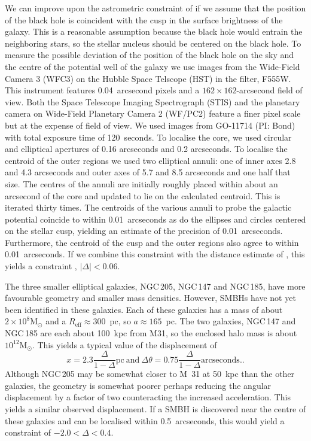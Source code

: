 \documentclass[useAMS,usenatbib]{mn2e}
\newcommand{\msun}{\mathrm{M}_\odot}
\begin{document}
We can improve upon the astrometric constraint of
\citet{2015arXiv150203231Y} if we assume that the position of the
black hole is coincident with the cusp in the surface brightness of
the galaxy.  This is a reasonable assumption because the black hole
would entrain the neighboring stars, so the stellar nucleus should be
centered on the black hole. To measure the possible deviation of the
position of the black hole on the sky and the centre of the potential
well of the galaxy we use images from the Wide-Field Camera 3 (WFC3)
on the Hubble Space Telscope (HST) in the filter, F555W.  This
instrument features 0.04~arcsecond pixels and a $162 \times
162$-arcsecond field of view.  Both the Space Telescope Imaging
Spectrograph (STIS) and the planetary camera on Wide-Field Planetary
Camera 2 (WF/PC2) feature a finer pixel scale but at the expense of
field of view.  We used images from GO-11714 (PI: Bond) with total
exposure time of 120~seconds.  To localise the core, we used circular
and elliptical apertures of 0.16 arcseconds and 0.2 arcseconds.  To
localise the centroid of the outer regions we used two elliptical
annuli: one of inner axes 2.8 and 4.3 arcseconds and outer axes of 5.7
and 8.5 arcseconds and one half that size.  The centres of the annuli
are initially roughly placed within about an arcsecond of the core and
updated to lie on the calculated centroid. This is iterated thirty
times.  The centroids of the various annuli to probe the galactic
potential coincide to within 0.01~arcseconds as do the ellipses and
circles centered on the stellar cusp, yielding an estimate of the
precision of 0.01~arcseconds.  Furthermore, the centroid of the cusp
and the outer regions also agree to within 0.01~arcseconds.  If we
combine this constraint with the distance estimate of
\citet{2006AJ....131.1405K}, this yields a 
constraint
, $|\Delta|<
0.06$.

The three smaller elliptical galaxies, NGC\,205, NGC\,147 and NGC\,185,
have more favourable geometry and smaller mass densities.  However,
SMBHs have not yet been identified in these galaxies.  Each of these
galaxies has a mass of about $2 \times 10^8 \msun$ and a
$R_\mathrm{eff} \approx 300$~pc, so $a \approx 165$~pc.  The two
galaxies, NGC\,147 and NGC\,185 are each about 100~kpc from M31, so the
enclosed halo mass is about $10^{12} \msun$.  This yields a
typical value of the displacement of
\begin{equation}
  x = 2.3 \frac{\Delta}{1-\Delta} \mathrm{pc} ~\mathrm{and}~
  \Delta \theta = 0.75 \frac{\Delta}{1-\Delta} \mathrm{arcseconds}.
  \label{eq:12}.
\end{equation}
Although NGC\,205 may be somewhat closer to M~31 at 50~kpc than the
other galaxies, the geometry is somewhat poorer perhaps reducing the
angular displacement by a factor of two counteracting the increased
acceleration.  This yields a similar observed displacement.  If a SMBH
is discovered near the centre of these galaxies and can be localised
within 0.5~arcseconds, this would yield a constraint of $-2.0 < \Delta
< 0.4$.
\end{document}
